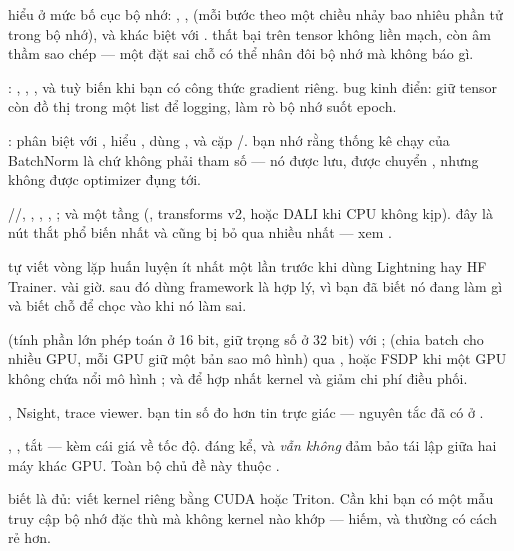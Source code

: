 \documentclass[../../../deep_learning.tex]{subfiles}
\begin{document}
\begin{mach}
\item {} \gp hiểu  ở mức bố cục bộ nhớ: , ,  (mỗi bước theo một chiều nhảy bao nhiêu phần tử trong bộ nhớ), và khác biệt  với . \hq {} thất bại trên tensor không liền mạch, còn  âm thầm sao chép --- một  đặt sai chỗ có thể nhân đôi bộ nhớ mà không báo gì.
\item {} \gp {}: , , , và  tuỳ biến khi bạn có công thức gradient riêng. \vdm bug kinh điển: giữ tensor còn đồ thị trong một list để logging, làm rò bộ nhớ suốt epoch.
\item {} \gp {}: phân biệt  với , hiểu , dùng , và cặp /. \gd bạn nhớ rằng thống kê chạy của BatchNorm là  chứ không phải tham số --- nó được lưu, được chuyển , nhưng không được optimizer đụng tới.
\item {} \gp {}//, , , , ; và một tầng  (, transforms v2, hoặc DALI khi CPU không kịp). \hq đây là nút thắt phổ biến nhất và cũng bị bỏ qua nhiều nhất --- xem .
\item {} \gp tự viết vòng lặp huấn luyện ít nhất một lần trước khi dùng Lightning hay HF Trainer. \gia vài giờ. \hq sau đó dùng framework là hợp lý, vì bạn đã biết nó đang làm gì và biết chỗ để chọc vào khi nó làm sai.
\item {} \gp {} (tính phần lớn phép toán ở 16 bit, giữ trọng số ở 32 bit) với ;  (chia batch cho nhiều GPU, mỗi GPU giữ một bản sao mô hình) qua , hoặc FSDP khi một GPU không chứa nổi mô hình \cite{rajbhandari2020zero}; và  để hợp nhất kernel và giảm chi phí điều phối.
\item {} \gp {}, Nsight, trace viewer. \gd bạn tin số đo hơn tin trực giác --- nguyên tắc đã có ở .
\item {} \gp {}, , tắt  --- kèm cái giá về tốc độ. \gia đáng kể, và \emph{vẫn không} đảm bảo tái lập giữa hai máy khác GPU. Toàn bộ chủ đề này thuộc .
\item \hq biết là đủ: viết kernel riêng bằng CUDA hoặc Triton. Cần khi bạn có một mẫu truy cập bộ nhớ đặc thù mà không kernel nào khớp --- hiếm, và thường có cách rẻ hơn.
\end{mach}
\end{document}
